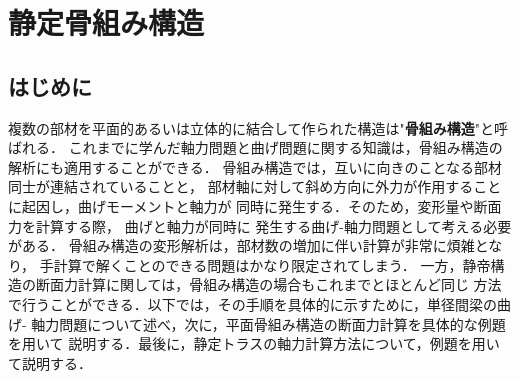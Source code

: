 \documentclass[10pt,a4j]{jbook}
\newlength{\minitwocolumn}
\begin{document}
\newcommand{\fat}[1]{\mbox{\boldmath $#1$}}
\newcommand{\D}{\partial}
\newcommand{\w}{\omega}
\newcommand{\ga}{\alpha}
\newcommand{\gb}{\beta}
\newcommand{\gx}{\xi}
\newcommand{\gz}{\zeta}
\newcommand{\vhat}[1]{\hat{\fat{#1}}}
\newcommand{\spc}{\vspace{0.7\baselineskip}}
\newcommand{\halfspc}{\vspace{0.3\baselineskip}}

\newcommand{\twofig}[2]
 {
   \begin{figure}
     \begin{minipage}[t]{\minitwocolumn}
         \begin{center}   #1
         \end{center}
     \end{minipage}
         \hspace{\columnsep}
     \begin{minipage}[t]{\minitwocolumn}
         \begin{center} #2
         \end{center}
     \end{minipage}
   \end{figure}
 }
\setcounter{chapter}{8}
\chapter{静定骨組み構造}
\section{はじめに}
複数の部材を平面的あるいは立体的に結合して作られた構造は"{\bf 骨組み構造}"と呼ばれる．
これまでに学んだ軸力問題と曲げ問題に関する知識は，骨組み構造の解析にも適用することができる．
骨組み構造では，互いに向きのことなる部材同士が連結されていることと，
部材軸に対して斜め方向に外力が作用することに起因し，曲げモーメントと軸力が
同時に発生する．そのため，変形量や断面力を計算する際， 曲げと軸力が同時に
発生する曲げ-軸力問題として考える必要がある．
骨組み構造の変形解析は，部材数の増加に伴い計算が非常に煩雑となり，
手計算で解くことのできる問題はかなり限定されてしまう．
一方，静帝構造の断面力計算に関しては，骨組み構造の場合もこれまでとほとんど同じ
方法で行うことができる．以下では，その手順を具体的に示すために，単径間梁の曲げ-
軸力問題について述べ，次に，平面骨組み構造の断面力計算を具体的な例題を用いて
説明する．最後に，静定トラスの軸力計算方法について，例題を用いて説明する．
\end{document}
